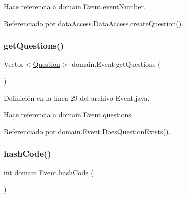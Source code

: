 \begin{DoxyCode}{0}

\end{DoxyCode}


Hace referencia a domain.\+Event.\+event\+Number.



Referenciado por data\+Access.\+Data\+Access.\+create\+Question().

\mbox{\label{classdomain_1_1Event_a00fc2897c3329b2319545e165e54b8da}} 
\subsubsection{\texorpdfstring{getQuestions()}{getQuestions()}}
{\footnotesize\ttfamily Vector$<$\mbox{\hyperlink{classdomain_1_1Question}{Question}}$>$ domain.\+Event.\+get\+Questions (\begin{DoxyParamCaption}{ }\end{DoxyParamCaption})}



Definición en la línea 29 del archivo Event.\+java.


\begin{DoxyCode}{0}

\end{DoxyCode}


Hace referencia a domain.\+Event.\+questions.



Referenciado por domain.\+Event.\+Does\+Question\+Exists().

\mbox{\label{classdomain_1_1Event_a8fc944944dd04c43c73bab5068b5349e}} 
\subsubsection{\texorpdfstring{hashCode()}{hashCode()}}
{\footnotesize\ttfamily int domain.\+Event.\+hash\+Code (\begin{DoxyParamCaption}{ }\end{DoxyParamCaption})}




